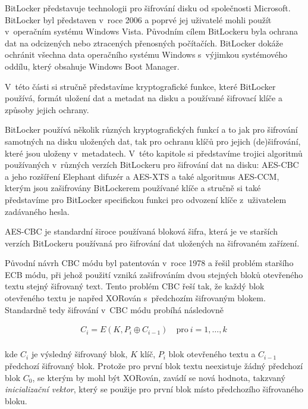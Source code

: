 
BitLocker představuje technologii pro šifrování disku od společnosti Microsoft. BitLocker byl představen v~roce 2006 a poprvé jej uživatelé mohli použít v~operačním systému Windows Vista. Původním cílem BitLockeru byla ochrana dat na odcizených nebo ztracených přenosných počítačích.\cite{Ferguson2006} BitLocker dokáže ochránit všechna data operačního systému Windows s~výjimkou systémového oddílu, který obsahuje Windows Boot Manager.\cite{Hall20191}

V~této části si stručně představíme kryptografické funkce, které BitLocker používá, formát uložení dat a metadat na disku a používané šifrovací klíče a způsoby jejich ochrany.

\label{sec:algorithms}

BitLocker používá několik různých kryptografických funkcí a to jak pro šifrování samotných na disku uložených dat, tak pro ochranu klíčů pro jejich (de)šifrování, které jsou uloženy v~metadatech. V~této kapitole si představíme trojici algoritmů používaných v~různých verzích BitLockeru pro šifrování dat na disku: AES-CBC a jeho rozšíření Elephant difuzér a AES-XTS a také algoritmus AES-CCM, kterým jsou zašifrovány BitLockerem používané klíče a stručně si také představíme pro BitLocker specifickou funkci pro odvození klíče z~uživatelem zadávaného hesla.

\label{sec:aes-cbc}

AES-CBC je standardní široce používaná bloková šifra, která je ve starších verzích BitLockeru používaná pro šifrování dat uložených na šifrovaném zařízení.

Původní návrh CBC módu byl patentován v~roce 1978\cite{Ehrsam1978} a řešil problém staršího ECB módu, při jehož použití vzniká zašifrováním dvou stejných bloků otevřeného textu stejný šifrovaný text. Tento problém CBC řeší tak, že každý blok otevřeného textu je napřed XORován s~předchozím šifrovaným blokem. Standardně tedy šifrování v~CBC módu probíhá následovně

\begin{align}
C_i = E(K, P_i \oplus C_{i-1}) \quad \text{pro}\ i = 1, \dots, k~\\ \nonumber
\end{align}

kde $C_i$ je výsledný šifrovaný blok, $K$ klíč, $P_i$ blok otevřeného textu a $C_{i-1}$ předchozí šifrovaný blok. Protože pro první blok textu neexistuje žádný předchozí blok $C_0$, se kterým by mohl být XORován, zavádí se nová hodnota, takzvaný \emph{inicializační vektor}, který se použije pro první blok místo předchozího šifrovaného bloku.\cite{Kohnoc2010}

